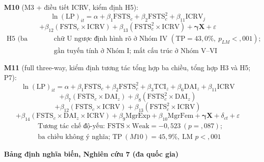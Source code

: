 \documentclass[
  a4paper,
  13pt]{extreport}
\begin{document}
\textbf{M10} (M3 + điều tiết ICRV, kiểm định H5):
\[\ln(\mathrm{LP})_{it} = \alpha + \beta_1 \mathrm{FSTS}_{c} + \beta_2 \mathrm{FSTS}_{c}^{2} + \beta_{11} \mathrm{ICRV}_{j}\]
\[+ \beta_{12}(\mathrm{FSTS}_{c} \times \mathrm{ICRV}) + \beta_{13}(\mathrm{FSTS}_{c}^{2} \times \mathrm{ICRV}) + \boldsymbol{\gamma}\mathbf{X} + \varepsilon\]
\[\begin{aligned}
\text{H5 (ba vùng): } & \text{chữ U ngược định hình rõ ở Nhóm IV } (\mathrm{TP} = 43{,}0\%,\ p_{LM} < {,}001); \\
& \text{gần tuyến tính ở Nhóm I; mất cấu trúc ở Nhóm V–VI}
\end{aligned}\]

\textbf{M11} (full three-way, kiểm định tương tác tổng hợp ba chiều,
tổng hợp H3 và H5; P7):
\[\ln(\mathrm{LP})_{it} = \alpha + \beta_1 \mathrm{FSTS}_{c} + \beta_2 \mathrm{FSTS}_{c}^{2} + \beta_3 \mathrm{TCI}_{z} + \beta_6 \mathrm{DAI}_{z} + \beta_{11} \mathrm{ICRV}\]
\[+ \beta_{7}(\mathrm{FSTS}_{c} \times \mathrm{DAI}_{z}) + \beta_{8}(\mathrm{FSTS}_{c}^{2} \times \mathrm{DAI}_{z})\]
\[+ \beta_{12}(\mathrm{FSTS}_{c} \times \mathrm{ICRV}) + \beta_{13}(\mathrm{FSTS}_{c}^{2} \times \mathrm{ICRV})\]
\[+ \beta_{14}(\mathrm{FSTS}_{c} \times \mathrm{DAI}_{z} \times \mathrm{ICRV}) + \beta_9 \mathrm{MgrExp} + \beta_{10} \mathrm{MgrFem} + \boldsymbol{\gamma}\mathbf{X} + \delta_{ct} + \varepsilon\]
\[\begin{aligned}
& \text{Tương tác chế độ-yếu: } \mathrm{FSTS} \times \text{Weak} = -0{,}523\ (p = {,}087); \\
& \text{ba chiều không ý nghĩa; } \mathrm{TP}\ (M10) = 45{,}9\%,\ \text{LM } p < {,}001
\end{aligned}\]

\textbf{Bảng định nghĩa biến, Nghiên cứu 7 (đa quốc gia)}
\end{document}
